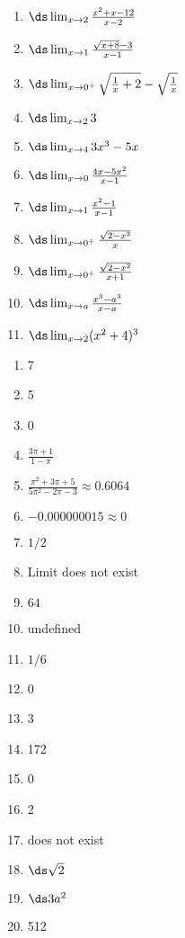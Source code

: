 \begin{enumialphparenastyle}
\begin{ex}
\begin{multicols}{2}
\begin{enumerate}
	\item	$\ds \lim_{x\to 2} {x^2+x-12\over x-2}$
	\item	$\ds \lim_{x\to 1} {\sqrt{x+8}-3\over x-1}$
	\item	$\ds \lim_{x\to 0^+} \sqrt{{1\over x}+2} - \sqrt{1\over x}$
	\item	$\ds\lim _{x\to 2} 3$
	\item	$\ds\lim _{x\to 4 } 3x^3 - 5x $
	\item	$\ds \lim _{x\to 0 } {4x - 5x^2\over x-1}$
	\item	$\ds\lim _{x\to 1 } {x^2 -1 \over x-1 }$
	\item	$\ds\lim _{x\to 0^ + } {\sqrt{2-x^2 }\over x}$
	\item	$\ds\lim _{x\to 0^ + } {\sqrt{2-x^2}\over x+1}$
	\item	$\ds\lim _{x\to a } {x^3 -a^3\over x-a}$
	\item	$\ds\lim _{x\to 2 } (x^2 +4)^3$
\end{enumerate}
\end{multicols}
\begin{sol}
\begin{multicols}{2}
\begin{enumerate}
	\item	7
	\item	5
	\item	0
	\item {$\frac{3\pi+1}{1-\pi}$}
	\item {$\frac{\pi^2+3\pi+5}{5\pi^2-2\pi-3} \approx 0.6064$}
	\item 	{$-0.000000015\approx 0$}
	\item {$1/2$}
	\item 	{Limit does not exist}
	\item 	{$64$}
	\item	undefined
	\item	$1/6$
	\item	0
	\item	3
	\item	172
	\item	0
	\item	2
	\item	does not exist
	\item	$\ds \sqrt2$
	\item	$\ds 3a^2$
	\item	512
\end{enumerate}
\end{multicols}
\end{sol}
\end{ex}


\end{enumialphparenastyle}
